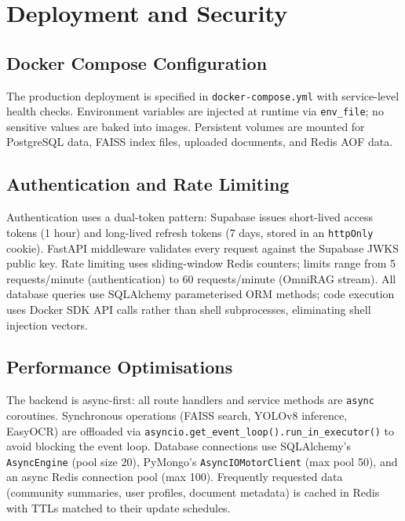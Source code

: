 \section{Deployment and Security}
\label{sec:devops}

\subsection{Docker Compose Configuration}
\label{subsec:docker-compose}

The production deployment is specified in \texttt{docker-compose.yml} with service-level health checks. Environment variables are injected at runtime via \texttt{env\_file}; no sensitive values are baked into images. Persistent volumes are mounted for PostgreSQL data, FAISS index files, uploaded documents, and Redis AOF data.

\subsection{Authentication and Rate Limiting}
\label{subsec:auth-impl}

Authentication uses a dual-token pattern: Supabase issues short-lived access tokens (1 hour) and long-lived refresh tokens (7 days, stored in an \texttt{httpOnly} cookie). FastAPI middleware validates every request against the Supabase JWKS public key. Rate limiting uses sliding-window Redis counters; limits range from 5 requests/minute (authentication) to 60 requests/minute (OmniRAG stream). All database queries use SQLAlchemy parameterised ORM methods; code execution uses Docker SDK API calls rather than shell subprocesses, eliminating shell injection vectors.

\subsection{Performance Optimisations}
\label{subsec:perf}

The backend is async-first: all route handlers and service methods are \texttt{async} coroutines. Synchronous operations (FAISS search, YOLOv8 inference, EasyOCR) are offloaded via \texttt{asyncio.get\_event\_loop().run\_in\_executor()} to avoid blocking the event loop. Database connections use SQLAlchemy's \texttt{AsyncEngine} (pool size 20), PyMongo's \texttt{AsyncIOMotorClient} (max pool 50), and an async Redis connection pool (max 100). Frequently requested data (community summaries, user profiles, document metadata) is cached in Redis with TTLs matched to their update schedules.
